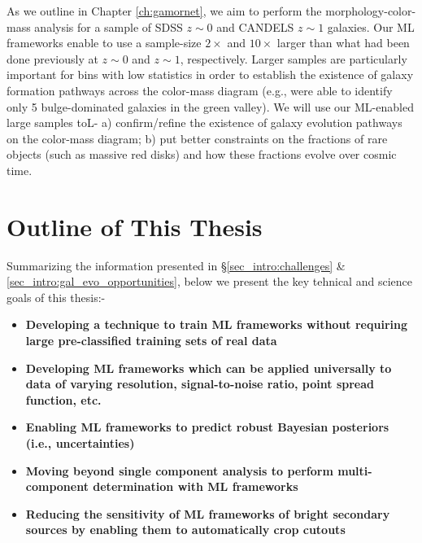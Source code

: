 As we outline in Chapter \ref{ch:gamornet}, we aim to perform the morphology-color-mass analysis for a sample of SDSS $z\sim0$ and CANDELS $z\sim1$ galaxies. Our ML frameworks enable to use a sample-size $2\times$ and $10\times$ larger than what had been done previously at $z\sim0$ and $z\sim1$, respectively. Larger samples are particularly important for bins with low statistics in order to establish the existence of galaxy formation pathways across the color-mass diagram (e.g., \cite{powell_17} were able to identify only 5 bulge-dominated galaxies in the green valley). We will use our ML-enabled large samples toL- a) confirm/refine the existence of galaxy evolution pathways on the color-mass diagram; b) put better constraints on the fractions of rare objects (such as massive red disks) and how these fractions evolve over cosmic time. 


\section{Outline of This Thesis} \label{sec_intro:thesis_outline}

Summarizing the information presented in \S \ref{sec_intro:challenges} \& \ref{sec_intro:gal_evo_opportunities}, below we present the key tehnical and science goals of this thesis:-

\begin{tcolorbox}[breakable,colback=blue!5!white,colframe=blue!75!black,title=\textbf{Key Technical Goals}]
\begin{itemize}
 \setlength\itemsep{-0.1em}
\item \textbf{Developing a technique to train ML frameworks without requiring large pre-classified training sets of real data}
\item \textbf{Developing ML frameworks which can be applied universally to data of varying resolution, signal-to-noise ratio, point spread function, etc.}
\item \textbf{Enabling ML frameworks to predict robust Bayesian posteriors (i.e., uncertainties)}
\item \textbf{Moving beyond single component analysis to perform multi-component determination with ML frameworks}
\item \textbf{Reducing the sensitivity of ML frameworks of bright secondary sources by enabling them to automatically crop cutouts}
\end{itemize}
\end{tcolorbox}

